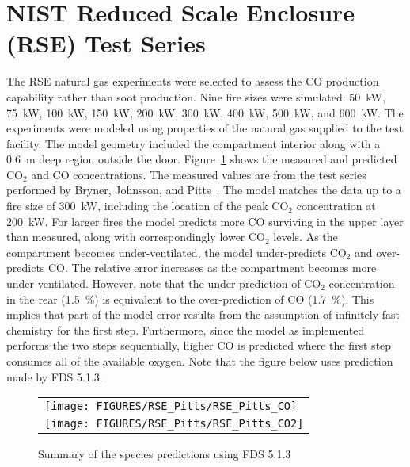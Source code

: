 \clearpage

\section{NIST Reduced Scale Enclosure (RSE) Test Series}

The RSE natural gas experiments were selected to assess the CO production capability rather than soot production.
Nine fire sizes were simulated: 50~kW, 75~kW, 100~kW, 150~kW, 200~kW, 300~kW, 400~kW,
500~kW, and 600~kW.  The experiments were modeled using properties of the natural gas supplied to the test facility.
The model geometry included the compartment interior along with a 0.6~m deep region outside the door.
Figure~\ref{RSE_Pitts_Species} shows the measured and predicted CO$_2$ and CO concentrations.  The measured values are
from the test series performed by Bryner, Johnsson, and Pitts~\cite{Bryner:1}.  The model matches the data up to a fire size of
300~kW, including the location of the peak CO$_2$ concentration at 200~kW.  For larger fires the model predicts more
CO surviving in the upper layer than measured, along with correspondingly lower CO$_2$ levels.
As the compartment becomes under-ventilated, the model under-predicts
CO$_2$ and over-predicts CO. The relative error increases as the compartment becomes more under-ventilated.  However,
note that the under-prediction of CO$_2$ concentration in the rear (1.5~\%) is equivalent to the
over-prediction of CO (1.7~\%).  This implies that part of the model error results from the assumption of
infinitely fast chemistry for the first step.  Furthermore, since the model as implemented performs the two steps
sequentially, higher CO is predicted where the first step consumes all of the available oxygen.  Note that
the figure below uses prediction made by FDS 5.1.3.

\begin{figure}[p]
\begin{center}
\begin{tabular}{l}
\texttt{[image: FIGURES/RSE\_Pitts/RSE\_Pitts\_CO]} \\
\texttt{[image: FIGURES/RSE\_Pitts/RSE\_Pitts\_CO2]} 
\end{tabular}
\end{center}
\caption{Summary of the species predictions using FDS 5.1.3}
\label{RSE_Pitts_Species}
\end{figure}
